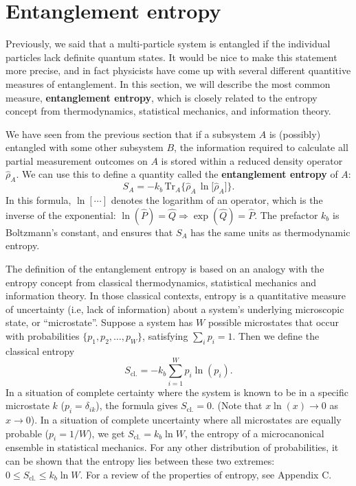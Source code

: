 \documentclass[pra,12pt]{revtex4-2}
\begin{document}
\section{Entanglement entropy}
\label{sec:entropy}

Previously, we said that a multi-particle system is entangled if the
individual particles lack definite quantum states.  It would be nice
to make this statement more precise, and in fact physicists have come
up with several different quantitive measures of entanglement.  In
this section, we will describe the most common measure,
\textbf{entanglement entropy}, which is closely related to the entropy
concept from thermodynamics, statistical mechanics, and information
theory.

We have seen from the previous section that if a subsystem $A$ is
(possibly) entangled with some other subsystem $B$, the information
required to calculate all partial measurement outcomes on $A$ is
stored within a reduced density operator $\hat{\rho}_A$.  We can use
this to define a quantity called the \textbf{entanglement entropy} of
$A$:
\begin{equation}
  S_{A} = - k_b \, \mathrm{Tr}_A \Big\{ \hat{\rho}_A\, \ln\!\big[\hat{\rho}_A\big]\Big\}.
  \label{entropy}
\end{equation}
In this formula, $\ln[\cdots]$ denotes the logarithm of an operator,
which is the inverse of the exponential: $\ln(\hat{P}) = \hat{Q}
\Rightarrow \exp(\hat{Q}) = \hat{P}$.  The prefactor $k_b$ is
Boltzmann's constant, and ensures that $S_A$ has the same units as
thermodynamic entropy.

The definition of the entanglement entropy is based on an analogy with
the entropy concept from classical thermodynamics, statistical
mechanics and information theory.  In those classical contexts,
entropy is a quantitative measure of uncertainty (i.e, lack of
information) about a system's underlying microscopic state, or
``microstate''.  Suppose a system has $W$ possible microstates that
occur with probabilities $\{p_1, p_2, \dots, p_W\}$, satisfying
$\sum_i p_i = 1$.  Then we define the classical entropy
\begin{equation}
  S_{\mathrm{cl.}} = - k_b \sum_{i=1}^W p_i \ln(p_i).
\end{equation}
In a situation of complete certainty where the system is known to be
in a specific microstate $k$ ($p_i = \delta_{ik}$), the formula gives
$S_{\mathrm{cl.}} = 0$.  (Note that $x \ln(x)\rightarrow 0$ as
$x\rightarrow 0$).  In a situation of complete uncertainty where all
microstates are equally probable ($p_i = 1/W$), we get
$S_{\mathrm{cl.}} = k_b \ln W$, the entropy of a microcanonical
ensemble in statistical mechanics.  For any other distribution of
probabilities, it can be shown that the entropy lies between these two
extremes: $0 \le S_{\mathrm{cl.}}  \le k_b\ln W$.  For a review of the
properties of entropy, see Appendix C.
\end{document}
